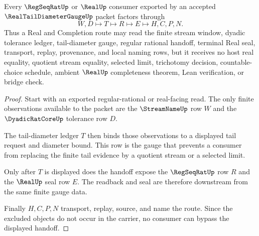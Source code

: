\begin{theorem}
\label{thm:real-tail-diameter-gauge-regseqrat-handoff}
Every $\RegSeqRatUp$ or $\RealUp$ consumer exported by an accepted $\RealTailDiameterGaugeUp$ packet factors through
$$
W,D \longmapsto T \longmapsto R \longmapsto E \longmapsto H,C,P,N .
$$
Thus a Real and Completion route may read the finite stream window, dyadic tolerance ledger, tail-diameter gauge, regular rational handoff, terminal Real seal, transport, replay, provenance, and local naming rows, but it receives no host real equality, quotient stream equality, selected limit, trichotomy decision, countable-choice schedule, ambient $\RealUp$ completeness theorem, Lean verification, or bridge check.
\end{theorem}
\begin{proof}
Start with an exported regular-rational or real-facing read. The only finite observations available to the packet are the $\StreamNameUp$ row $W$ and the $\DyadicRatCoreUp$ tolerance row $D$.

The tail-diameter ledger $T$ then binds those observations to a displayed tail request and diameter bound. This row is the gauge that prevents a consumer from replacing the finite tail evidence by a quotient stream or a selected limit.

Only after $T$ is displayed does the handoff expose the $\RegSeqRatUp$ row $R$ and the $\RealUp$ seal row $E$. The readback and seal are therefore downstream from the same finite gauge data.

Finally $H,C,P,N$ transport, replay, source, and name the route. Since the excluded objects do not occur in the carrier, no consumer can bypass the displayed handoff.
\end{proof}


\begin{closurestatus}{\RealTailDiameterGaugeUp}
  \theoryclosure{\seedClosure}
  \formalstatus{\unformalizedV}
\end{closurestatus}
